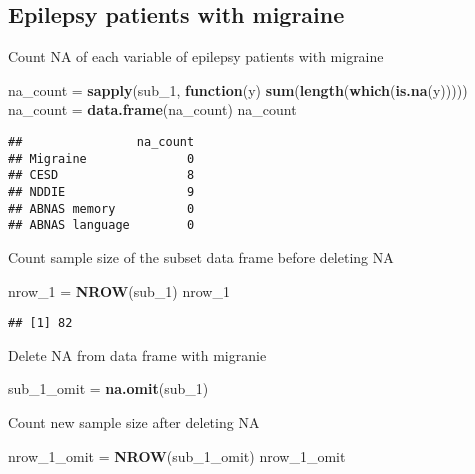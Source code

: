 \documentclass[]{article}
\newenvironment{Shaded}{\begin{snugshade}}{\end{snugshade}}
\newcommand{\KeywordTok}[1]{\textcolor[rgb]{0.13,0.29,0.53}{\textbf{#1}}}
\newcommand{\DecValTok}[1]{\textcolor[rgb]{0.00,0.00,0.81}{#1}}
\newcommand{\StringTok}[1]{\textcolor[rgb]{0.31,0.60,0.02}{#1}}
\newcommand{\ControlFlowTok}[1]{\textcolor[rgb]{0.13,0.29,0.53}{\textbf{#1}}}
\newcommand{\NormalTok}[1]{#1}
\begin{document}
\subsection{Epilepsy patients with
migraine}\label{epilepsy-patients-with-migraine}

Count NA of each variable of epilepsy patients with migraine

\begin{Shaded}
\begin{Highlighting}[]
\NormalTok{na_count =}\StringTok{ }\KeywordTok{sapply}\NormalTok{(sub_}\DecValTok{1}\NormalTok{, }\ControlFlowTok{function}\NormalTok{(y) }\KeywordTok{sum}\NormalTok{(}\KeywordTok{length}\NormalTok{(}\KeywordTok{which}\NormalTok{(}\KeywordTok{is.na}\NormalTok{(y)))))}
\NormalTok{na_count =}\StringTok{ }\KeywordTok{data.frame}\NormalTok{(na_count)}
\NormalTok{na_count}
\end{Highlighting}
\end{Shaded}

\begin{verbatim}
##                na_count
## Migraine              0
## CESD                  8
## NDDIE                 9
## ABNAS memory          0
## ABNAS language        0
\end{verbatim}

Count sample size of the subset data frame before deleting NA

\begin{Shaded}
\begin{Highlighting}[]
\NormalTok{nrow_}\DecValTok{1}\NormalTok{ =}\StringTok{ }\KeywordTok{NROW}\NormalTok{(sub_}\DecValTok{1}\NormalTok{)}
\NormalTok{nrow_}\DecValTok{1}
\end{Highlighting}
\end{Shaded}

\begin{verbatim}
## [1] 82
\end{verbatim}

Delete NA from data frame with migranie

\begin{Shaded}
\begin{Highlighting}[]
\NormalTok{sub_1_omit =}\StringTok{ }\KeywordTok{na.omit}\NormalTok{(sub_}\DecValTok{1}\NormalTok{)}
\end{Highlighting}
\end{Shaded}

Count new sample size after deleting NA

\begin{Shaded}
\begin{Highlighting}[]
\NormalTok{nrow_1_omit =}\StringTok{ }\KeywordTok{NROW}\NormalTok{(sub_1_omit)}
\NormalTok{nrow_1_omit}
\end{Highlighting}
\end{Shaded}
\end{document}
